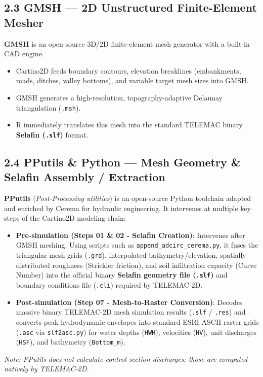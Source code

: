\documentclass[10pt,a4paper]{article}
\begin{document}
\subsection*{2.3 GMSH — 2D Unstructured Finite-Element Mesher}
\textbf{GMSH} is an open-source 3D/2D finite-element mesh generator with a built-in CAD engine.
\begin{itemize}[leftmargin=1.5em, itemsep=2pt, topsep=2pt]
  \item Cartino2D feeds boundary contours, elevation breaklines (embankments, roads, ditches, valley bottoms), and variable target mesh sizes into GMSH.
  \item GMSH generates a high-resolution, topography-adaptive Delaunay triangulation (\texttt{.msh}).
  \item R immediately translates this mesh into the standard TELEMAC binary \textbf{Selafin (\texttt{.slf})} format.
\end{itemize}

\subsection*{2.4 PPutils \& Python — Mesh Geometry \& Selafin Assembly / Extraction}
\textbf{PPutils} (\textit{Post-Processing utilities}) is an open-source Python toolchain adapted and enriched by Cerema for hydraulic engineering. It intervenes at multiple key steps of the Cartino2D modeling chain:
\begin{itemize}[leftmargin=1.5em, itemsep=2pt, topsep=2pt]
  \item \textbf{Pre-simulation (Steps 01 \& 02 - Selafin Creation)}: Intervenes after GMSH meshing. Using scripts such as \texttt{append\_adcirc\_cerema.py}, it fuses the triangular mesh grids (\texttt{.grd}), interpolated bathymetry/elevation, spatially distributed roughness (Strickler friction), and soil infiltration capacity (Curve Number) into the official binary \textbf{Selafin geometry file (\texttt{.slf})} and boundary conditions file (\texttt{.cli}) required by TELEMAC-2D.
  \item \textbf{Post-simulation (Step 07 - Mesh-to-Raster Conversion)}: Decodes massive binary TELEMAC-2D mesh simulation results (\texttt{.slf} / \texttt{.res}) and converts peak hydrodynamic envelopes into standard ESRI ASCII raster grids (\texttt{.asc} via \texttt{slf2asc.py}) for water depths (\texttt{HWH}), velocities (\texttt{HV}), unit discharges (\texttt{HSF}), and bathymetry (\texttt{Bottom\_m}).
\end{itemize}
\textit{Note: PPutils does not calculate control section discharges; those are computed natively by TELEMAC-2D.}
\end{document}
